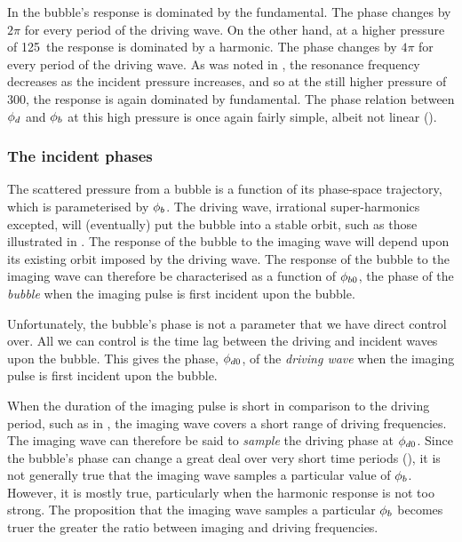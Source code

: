 In  the bubble's response is dominated by the fundamental.
The phase changes by $2\pi$ for every period of the driving wave.
On the other hand, at a higher pressure of \unit{125}\kilo\pascal\ the response is dominated by a harmonic. %
The phase changes by $4\pi$ for every period of the driving wave.
As was noted in ,
the resonance frequency decreases as the incident pressure increases,
and so at the still higher pressure of  \unit{300}\kilo\pascal, the response is again dominated by fundamental.
The phase relation between ${\phi_d}$ and ${\phi_b}$ at this high pressure is once again fairly simple, albeit not linear ().

\subsubsection{The incident phases}\label{sec:driving_phase}
The scattered pressure from a bubble is a function of its phase-space trajectory,
which is parameterised by  ${\phi_b}$.
The driving wave, irrational super-harmonics excepted,
will (eventually) put the bubble into a stable orbit, such as those illustrated in .
The response of the bubble to the imaging wave will depend upon its existing orbit 
imposed by the driving wave.
The response of the bubble to the imaging wave can therefore be characterised as a function of  ${\phi_{b0}}$,
the phase of the {\em bubble} when the imaging pulse is first incident upon the bubble.

Unfortunately, the bubble's phase is not a parameter that we have direct control over.
All we can control is the time lag between the driving and incident waves upon the bubble.
This gives the phase, ${\phi_{d0}}$, of the {\em driving wave} when the imaging pulse is first incident upon the bubble.

When the duration of the imaging pulse is short in comparison to the driving period,
such as in ,
the imaging wave covers a short range of driving frequencies.
The imaging wave can therefore be said to {\em sample} the driving phase at ${\phi_{d0}}$.
Since the bubble's phase can change a great deal over very short time periods (),
it is not generally true that the imaging wave samples a particular value of ${\phi_b}$.
However, it is mostly true, particularly when the harmonic response is not too strong.
The proposition that the imaging wave samples a particular ${\phi_b}$ becomes  truer the greater the ratio between imaging and driving frequencies.

